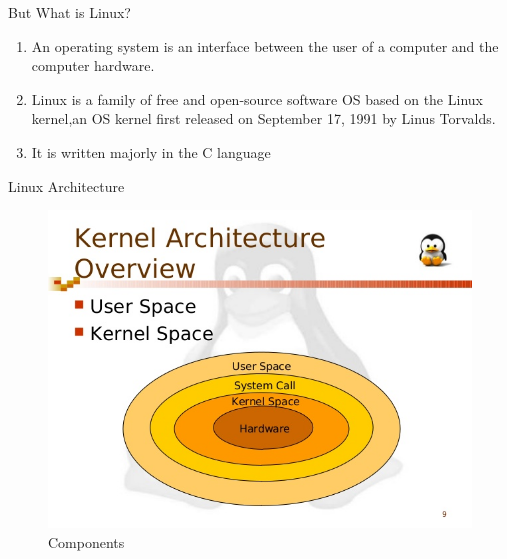 \documentclass{beamer}
\begin{document}
\begin{frame}{But What is Linux?}\vspace{10pt}
   \begin{enumerate}
   \item An operating system is an interface between the user of a computer and the computer hardware.
   
    \item Linux is a family of free and open-source software OS based on the Linux kernel,an OS kernel first released on September 17, 1991 by Linus Torvalds.
    
    \item It is written majorly in the C language
\end{enumerate} 
\end{frame}
\begin{frame}[t]{Linux Architecture}
    \begin{figure}
    \includegraphics[width = \paperwidth]{linux-kernel-architecture-9-638.jpg}
    \caption{Components}
    \end{figure}
\end{frame}
\end{document}
